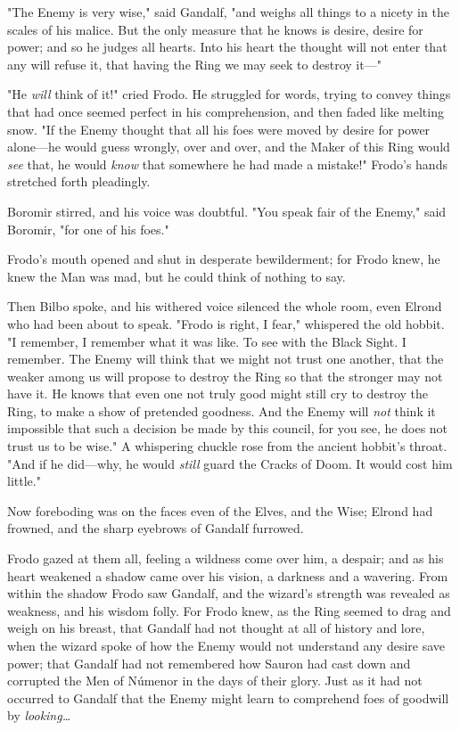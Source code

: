 "The Enemy is very wise," said Gandalf, "and weighs all things to a nicety in 
the scales of his malice. But the only measure that he knows is desire, desire 
for power; and so he judges all hearts. Into his heart the thought will not 
enter that any will refuse it, that having the Ring we may seek to destroy 
it---"

"He \emph{will} think of it!" cried Frodo. He struggled for words, trying to 
convey things that had once seemed perfect in his comprehension, and then faded 
like melting snow. "If the Enemy thought that all his foes were moved by desire 
for power alone---he would guess wrongly, over and over, and the Maker of this 
Ring would \emph{see} that, he would \emph{know} that somewhere he had made a 
mistake!" Frodo's hands stretched forth pleadingly.

Boromir stirred, and his voice was doubtful. "You speak fair of the Enemy," 
said Boromir, "for one of his foes."

Frodo's mouth opened and shut in desperate bewilderment; for Frodo knew, he 
knew the Man was mad, but he could think of nothing to say.

Then Bilbo spoke, and his withered voice silenced the whole room, even Elrond 
who had been about to speak. "Frodo is right, I fear," whispered the old 
hobbit. "I remember, I remember what it was like. To see with the Black Sight. 
I remember. The Enemy will think that we might not trust one another, that the 
weaker among us will propose to destroy the Ring so that the stronger may not 
have it. He knows that even one not truly good might still cry to destroy the 
Ring, to make a show of pretended goodness. And the Enemy will \emph{not} think 
it impossible that such a decision be made by this council, for you see, he 
does not trust us to be wise." A whispering chuckle rose from the ancient 
hobbit's throat. "And if he did---why, he would \emph{still} guard the Cracks 
of Doom. It would cost him little."

Now foreboding was on the faces even of the Elves, and the Wise; Elrond had 
frowned, and the sharp eyebrows of Gandalf furrowed.

Frodo gazed at them all, feeling a wildness come over him, a despair; and as 
his heart weakened a shadow came over his vision, a darkness and a wavering. 
From within the shadow Frodo saw Gandalf, and the wizard's strength was 
revealed as weakness, and his wisdom folly. For Frodo knew, as the Ring seemed 
to drag and weigh on his breast, that Gandalf had not thought at all of history 
and lore, when the wizard spoke of how the Enemy would not understand any 
desire save power; that Gandalf had not remembered how Sauron had cast down and 
corrupted the Men of Númenor in the days of their glory. Just as it had not 
occurred to Gandalf that the Enemy might learn to comprehend foes of goodwill 
by \emph{looking{\ldots}}

